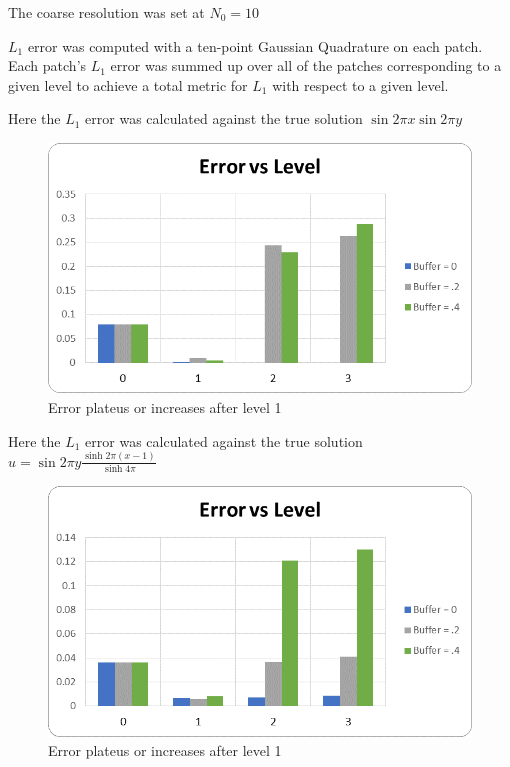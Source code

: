\documentclass[final]{siamart1116}
\numberwithin{theorem}{section}
\begin{document}
The coarse resolution was set at $N_0 = 10$

$L_1$ error was computed with a ten-point Gaussian Quadrature on each patch. Each patch's $L_1$ error was summed up over all of the patches corresponding to a given level to achieve a total metric for $L_1$ with respect to a given level.  



Here the $L_1$ error was calculated against the true solution $\sin{2\pi x}\sin{2 \pi y} $

\begin{figure}[h]
\begin{center}
  \includegraphics[scale=.5]{convergencechebsinsin.png}
  \caption{Error plateus or increases after level 1}
\end{center}
\end{figure}



Here the $L_1$ error was calculated against the true solution $u = \sin{2\pi y}\frac{\sinh{2 \pi (x-1)} }{\sinh{4\pi}}$

\begin{figure}[H]
\begin{center}
  \includegraphics[scale=.5]{convergencechebsinhsin.png}
  \caption{Error plateus or increases after level 1}
\end{center}
\end{figure}
\end{document}
